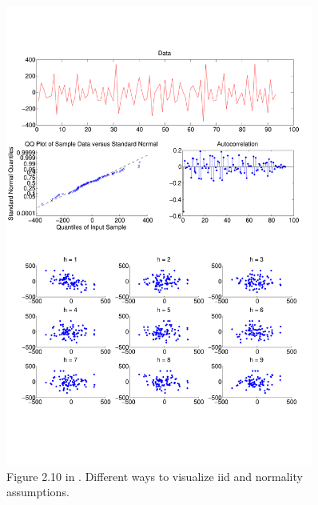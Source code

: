 \documentclass[10pt]{article}
\begin{document}
\begin{figure}[htp!]
  \centering
  \includegraphics[width=0.9\textwidth, trim=0 100 0 100]{images/hw1_1_210.pdf}
  \caption{Figure 2.10 in \cite{leb}. Different ways to visualize iid and normality assumptions.}
  \label{fig:210}
\end{figure}

\clearpage
\end{document}
